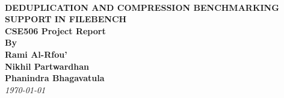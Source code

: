 \begin{titlepage}
 
\begin{center}

\ \\[1.5cm] 
\textbf{\Large DEDUPLICATION AND COMPRESSION BENCHMARKING SUPPORT IN FILEBENCH}\\[1.5cm]
 
 
 \textbf{ \small CSE506 Project Report}\\[1.5cm]

\textbf{By\\Rami Al-Rfou'\\ Nikhil Partwardhan \\ Phanindra Bhagavatula}\\[1.5cm]
{\textit{ \today}} 


\end{center}
\vfill
\end{titlepage}
